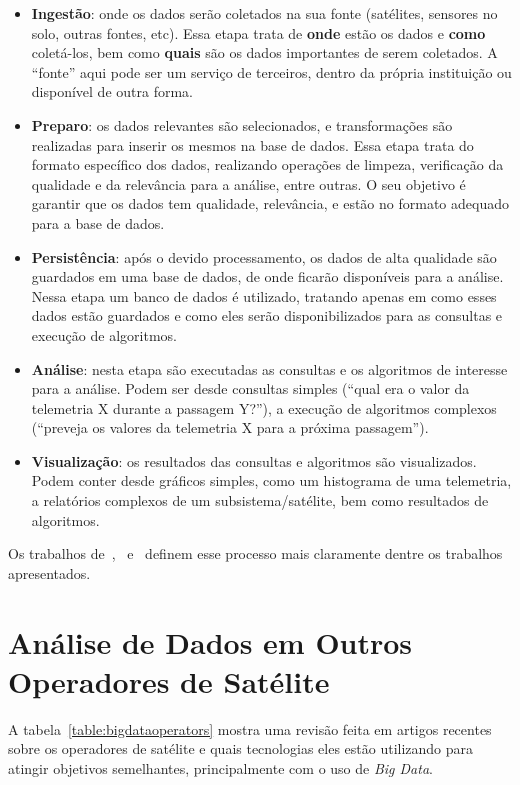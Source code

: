 \begin{itemize}
	\item \textbf{Ingestão}: onde os dados serão coletados na sua fonte (satélites, sensores no solo, outras fontes, etc).
	      Essa etapa trata de \textbf{onde} estão os dados e \textbf{como} coletá-los, bem como \textbf{quais} são os dados importantes de serem coletados.
	      A ``fonte'' aqui pode ser um serviço de terceiros, dentro da própria instituição ou disponível de outra forma.
	\item \textbf{Preparo}: os dados relevantes são selecionados, e transformações são realizadas para inserir os mesmos na base de dados.
	      Essa etapa trata do formato específico dos dados, realizando operações de limpeza, verificação da qualidade e da relevância para a análise, entre outras.
	      O seu objetivo é garantir que os dados tem qualidade, relevância, e estão no formato adequado para a base de dados.
	\item \textbf{Persistência}: após o devido processamento, os dados de alta qualidade são guardados em uma base de dados, de onde ficarão disponíveis para a análise.
	      Nessa etapa um banco de dados é utilizado, tratando apenas em como esses dados estão guardados e como eles serão disponibilizados para as consultas e execução de algoritmos.
	\item \textbf{Análise}: nesta etapa são executadas as consultas e os algoritmos de interesse para a análise.
	      Podem ser desde consultas simples (``qual era o valor da telemetria X durante a passagem Y?''), a execução de algoritmos complexos (``preveja os valores da telemetria X para a próxima passagem'').
	\item \textbf{Visualização}: os resultados das consultas e algoritmos são visualizados.
	      Podem conter desde gráficos simples, como um histograma de uma telemetria, a relatórios complexos de um subsistema/satélite, bem como resultados de algoritmos.
\end{itemize}

Os trabalhos de~\cite{zhangBigDataFramework2017},~\cite{mateikUsingBigData2017} e~\cite{boussoufBigDataBased2018} definem esse processo mais claramente dentre os trabalhos apresentados.

\section{Análise de Dados em Outros Operadores de Satélite}\label{ch:corr:ops}

A tabela~\ref{table:bigdataoperators} mostra uma revisão feita em artigos recentes sobre os operadores de satélite e quais tecnologias eles estão utilizando para atingir objetivos semelhantes, principalmente com o uso de \textit{Big Data}.

